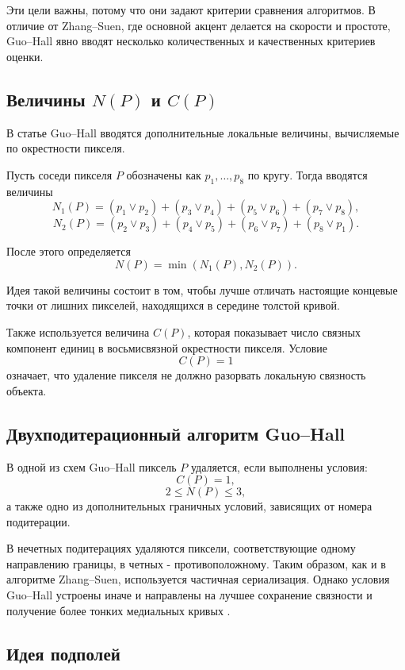 \documentclass[12pt,a4paper]{article}
\begin{document}
Эти цели важны, потому что они задают критерии сравнения алгоритмов. В отличие от Zhang--Suen, где основной акцент делается на скорости и простоте, Guo--Hall явно вводят несколько количественных и качественных критериев оценки.

\subsection{Величины $N(P)$ и $C(P)$}

В статье Guo--Hall вводятся дополнительные локальные величины, вычисляемые по окрестности пикселя.

Пусть соседи пикселя $P$ обозначены как $p_1,\ldots,p_8$ по кругу. Тогда вводятся величины
\[
    N_1(P)=
    (p_1\vee p_2)+
    (p_3\vee p_4)+
    (p_5\vee p_6)+
    (p_7\vee p_8),
\]
\[
    N_2(P)=
    (p_2\vee p_3)+
    (p_4\vee p_5)+
    (p_6\vee p_7)+
    (p_8\vee p_1).
\]

После этого определяется
\[
    N(P)=\min(N_1(P),N_2(P)).
\]

Идея такой величины состоит в том, чтобы лучше отличать настоящие концевые точки от лишних пикселей, находящихся в середине толстой кривой.

Также используется величина $C(P)$, которая показывает число связных компонент единиц в восьмисвязной окрестности пикселя. Условие
\[
    C(P)=1
\]
означает, что удаление пикселя не должно разорвать локальную связность объекта.

\subsection{Двухподитерационный алгоритм Guo--Hall}

В одной из схем Guo--Hall пиксель $P$ удаляется, если выполнены условия:
\[
    C(P)=1,
\]
\[
    2 \le N(P) \le 3,
\]
а также одно из дополнительных граничных условий, зависящих от номера подитерации.

В нечетных подитерациях удаляются пиксели, соответствующие одному направлению границы, в четных - противоположному. Таким образом, как и в алгоритме Zhang--Suen, используется частичная сериализация. Однако условия Guo--Hall устроены иначе и направлены на лучшее сохранение связности и получение более тонких медиальных кривых \cite{guo1989}.

\subsection{Идея подполей}
\end{document}
